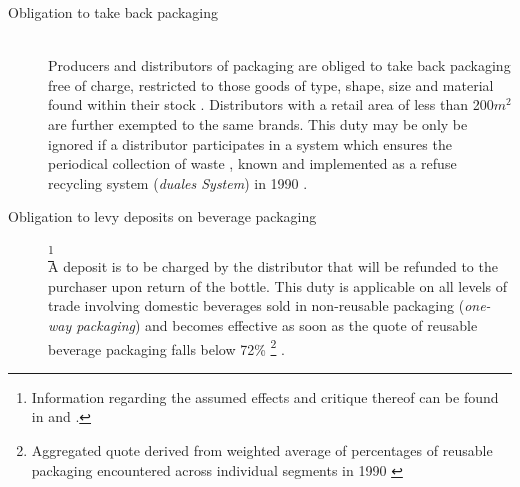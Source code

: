 \begin{description}
	\item[Obligation to take back packaging]
	\hfill \\
	Producers and distributors of packaging are obliged to take back packaging free of charge, restricted to those goods of type, shape, size and material found within their stock \cite[§§~4-6]{verpackV1991}. Distributors with a retail area of less than 200$m^2$ are further exempted to the same brands. This duty may be only be ignored if a distributor participates in a system which ensures the periodical collection of waste \cite[§~6]{verpackV1991}, known and implemented as a refuse recycling system (\textit{duales System}) in 1990 \cite[p.~3]{Hartlep2011Recycling}.
	\item[Obligation to levy deposits on \gls{beverage packaging}] \footnote{Information regarding the assumed effects and critique thereof can be found in \cite[p.~630]{Cora2000} and \cite{wacker2008pflichtpfand}.}
	\hfill \\
	A deposit is to be charged by the distributor that will be refunded to the purchaser upon return of the bottle. This duty is applicable on all levels of trade involving domestic beverages sold in non-\gls{reusable packaging} (\textit{one-way packaging}) \cite[§~7]{verpackV1991} and becomes effective as soon as the quote of reusable beverage packaging falls below 72\% \footnote{Aggregated quote derived from weighted average of percentages of reusable packaging encountered across individual segments in 1990 \cite[§~9]{verpackV1991} \cite[p.~134]{Rummler/Schutt1991}} \cite[§~9]{verpackV1991}.
\end{description}

